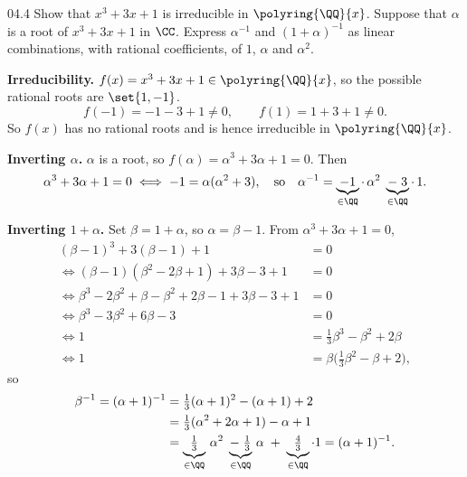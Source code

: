 \documentclass[11pt]{article}
\begin{document}
\begin{problem}{04.4}
  Show that $x^{3} + 3x + 1$ is irreducible in $\polyring{\QQ}{x}$. Suppose
  that $\alpha$ is a root of $x^{3} + 3x + 1$ in $\CC$. Express $\alpha^{-1}$
  and $(1 + \alpha)^{-1}$ as linear combinations, with rational coefficients,
  of $1$, $\alpha$ and $\alpha^{2}$.
\end{problem}
\begin{solution}
  \textbf{Irreducibility.} $f(x) = x^{3} + 3x + 1 \in \polyring{\QQ}{x}$, so
  the possible rational roots are $\set{1, -1}$.
  \[
    f(-1) = -1 - 3 + 1 \neq 0, \qquad f(1) = 1 + 3 + 1 \neq 0 .
  \]
  So $f(x)$ has no rational roots and is hence irreducible in
  $\polyring{\QQ}{x}$.

  \medskip
  \textbf{Inverting $\alpha$.} $\alpha$ is a root, so
  $f(\alpha) = \alpha^{3} + 3\alpha + 1 = 0$. Then
  \[
    \alpha^{3} + 3\alpha + 1 = 0
    \iff
    -1 = \alpha(\alpha^{2} + 3),
    \quad\text{so}\quad
    \alpha^{-1} = \underbrace{-1}_{\in\QQ}\cdot\,\alpha^{2}
                  \;\underbrace{-\;3}_{\in\QQ}\cdot\,1 .
  \]

  \medskip
  \textbf{Inverting $1 + \alpha$.} Set $\beta = 1 + \alpha$, so
  $\alpha = \beta - 1$. From $\alpha^{3} + 3\alpha + 1 = 0$,
  \begin{align*}
    (\beta - 1)^{3} + 3(\beta - 1) + 1 &= 0 \\
    \iff (\beta - 1)(\beta^{2} - 2\beta + 1) + 3\beta - 3 + 1 &= 0 \\
    \iff \beta^{3} - 2\beta^{2} + \beta - \beta^{2} + 2\beta - 1
         + 3\beta - 3 + 1 &= 0 \\
    \iff \beta^{3} - 3\beta^{2} + 6\beta - 3 &= 0 \\
    \iff 1 &= \tfrac{1}{3}\beta^{3} - \beta^{2} + 2\beta \\
    \iff 1 &= \beta\bigl(\tfrac{1}{3}\beta^{2} - \beta + 2\bigr),
  \end{align*}
  so
  \begin{align*}
    \beta^{-1} = (\alpha + 1)^{-1}
      &= \tfrac{1}{3}(\alpha + 1)^{2} - (\alpha + 1) + 2 \\
      &= \tfrac{1}{3}(\alpha^{2} + 2\alpha + 1) - \alpha + 1 \\
      &= \underbrace{\tfrac{1}{3}}_{\in\QQ}\,\alpha^{2}
         \;\underbrace{-\;\tfrac{1}{3}}_{\in\QQ}\,\alpha
         \;+\;\underbrace{\tfrac{4}{3}}_{\in\QQ}\cdot 1
       = (\alpha + 1)^{-1}.
  \end{align*}
\end{solution}
\end{document}
